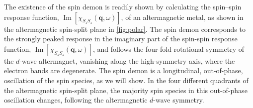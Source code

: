 \documentclass[aps,prl,reprint,twocolumns,superscriptaddress]{revtex4-2}
\DeclareMathOperator{\Imm}{Im}
\newcommand{\subfigref}[2]{Fig.~\hyperref[#1]{\ref*{#1}#2}}
\begin{document}
	
	The existence of the spin demon is readily shown by calculating the spin–spin response function, $\Imm[\chi_{S_zS_z}(\bm q,\omega)]$, of an altermagnetic metal, as shown in the altermagnetic spin-split plane in \cref{fig:polar}. The spin demon corresponds to the strongly peaked response in the imaginary part of the spin-spin response function, $\Imm[\chi_{S_zS_z}(\bm q,\omega)]$, and follows the four-fold rotational symmetry of the $d$-wave altermagnet, vanishing along the high-symmetry axis, where the electron bands are degenerate. The spin demon is a longitudinal, out-of-phase, oscillation of the spin species, as we will show. In the four different quadrants of the altermagnetic spin-split plane, the majority spin species in this out-of-phase oscillation changes, following the altermagnetic $d$-wave symmetry. 
	
	
	
	
	
	
	
\end{document}
